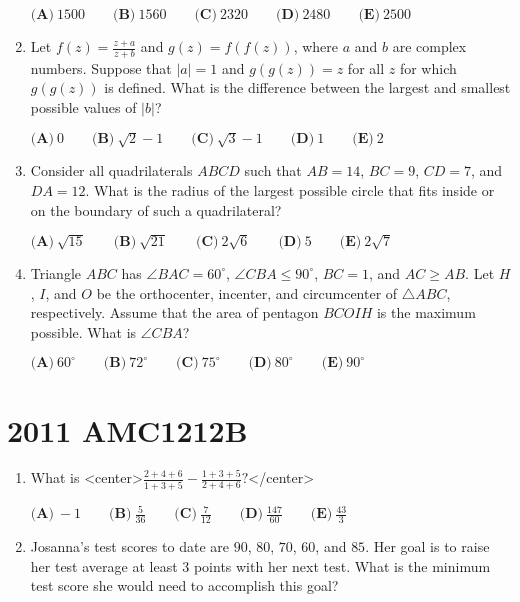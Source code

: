 \documentclass{article}
\begin{document}
\begin{enumerate}[label=\arabic*., itemsep=0.5em]
\(
\textbf{(A)}\ 1500 \qquad
\textbf{(B)}\ 1560 \qquad
\textbf{(C)}\ 2320 \qquad
\textbf{(D)}\ 2480 \qquad
\textbf{(E)}\ 2500 \)\par \vspace{0.5em}\item Let \(f(z)= \frac{z+a}{z+b}\) and \(g(z)=f(f(z))\), where \(a\) and \(b\) are complex numbers. Suppose that \(\left| a \right| = 1\) and \(g(g(z))=z\) for all \(z\) for which \(g(g(z))\) is defined. What is the difference between the largest and smallest possible values of \(\left| b \right|\)?

\(
\textbf{(A)}\ 0 \qquad
\textbf{(B)}\ \sqrt{2}-1 \qquad
\textbf{(C)}\ \sqrt{3}-1 \qquad
\textbf{(D)}\ 1 \qquad
\textbf{(E)}\ 2 \)\par \vspace{0.5em}\item Consider all quadrilaterals \(ABCD\) such that \(AB=14\), \(BC=9\), \(CD=7\), and \(DA=12\). What is the radius of the largest possible circle that fits inside or on the boundary of such a quadrilateral?

\(
\textbf{(A)}\ \sqrt{15} \qquad
\textbf{(B)}\ \sqrt{21} \qquad
\textbf{(C)}\ 2\sqrt{6} \qquad
\textbf{(D)}\ 5 \qquad
\textbf{(E)}\ 2\sqrt{7} \)\par \vspace{0.5em}\item Triangle \(ABC\) has \(\angle BAC = 60^{\circ}\), \(\angle CBA \leq 90^{\circ}\), \(BC=1\), and \(AC \geq AB\). Let \(H\), \(I\), and \(O\) be the orthocenter, incenter, and circumcenter of \(\triangle ABC\), respectively. Assume that the area of pentagon \(BCOIH\) is the maximum possible. What is \(\angle CBA\)?

\(
\textbf{(A)}\ 60^{\circ} \qquad
\textbf{(B)}\ 72^{\circ} \qquad
\textbf{(C)}\ 75^{\circ} \qquad
\textbf{(D)}\ 80^{\circ} \qquad
\textbf{(E)}\ 90^{\circ} \)\par \vspace{0.5em}\end{enumerate}\newpage\section*{2011 AMC1212B}\begin{enumerate}[label=\arabic*., itemsep=0.5em]\item What is <center>\( \frac{2+4+6}{1+3+5}-\frac{1+3+5}{2+4+6}? \)</center>


\(\textbf{(A)}\ -1 \qquad \textbf{(B)}\ \frac{5}{36} \qquad \textbf{(C)}\ \frac{7}{12} \qquad \textbf{(D)}\ \frac{147}{60} \qquad \textbf{(E)}\ \frac{43}{3}\)\par \vspace{0.5em}\item Josanna's test scores to date are \(90\), \(80\), \(70\), \(60\), and \(85\).  Her goal is to raise her test average at least \(3\) points with her next test.  What is the minimum test score she would need to accomplish this goal?


\end{enumerate}
\end{document}

